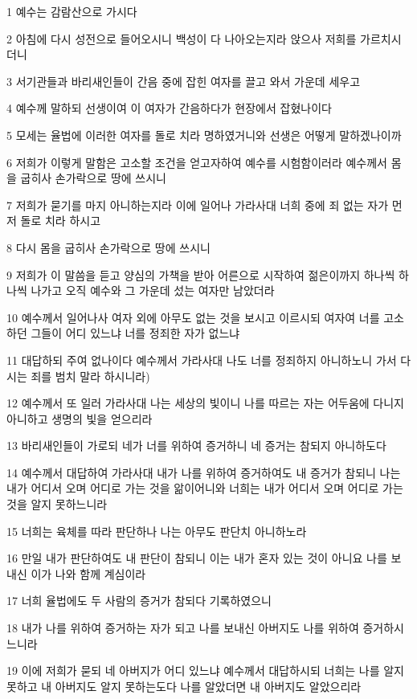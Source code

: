\par 1 예수는 감람산으로 가시다
\par 2 아침에 다시 성전으로 들어오시니 백성이 다 나아오는지라 앉으사 저희를 가르치시더니
\par 3 서기관들과 바리새인들이 간음 중에 잡힌 여자를 끌고 와서 가운데 세우고
\par 4 예수께 말하되 선생이여 이 여자가 간음하다가 현장에서 잡혔나이다
\par 5 모세는 율법에 이러한 여자를 돌로 치라 명하였거니와 선생은 어떻게 말하겠나이까
\par 6 저희가 이렇게 말함은 고소할 조건을 얻고자하여 예수를 시험함이러라 예수께서 몸을 굽히사 손가락으로 땅에 쓰시니
\par 7 저희가 묻기를 마지 아니하는지라 이에 일어나 가라사대 너희 중에 죄 없는 자가 먼저 돌로 치라 하시고
\par 8 다시 몸을 굽히사 손가락으로 땅에 쓰시니
\par 9 저희가 이 말씀을 듣고 양심의 가책을 받아 어른으로 시작하여 젊은이까지 하나씩 하나씩 나가고 오직 예수와 그 가운데 섰는 여자만 남았더라
\par 10 예수께서 일어나사 여자 외에 아무도 없는 것을 보시고 이르시되 여자여 너를 고소하던 그들이 어디 있느냐 너를 정죄한 자가 없느냐
\par 11 대답하되 주여 없나이다 예수께서 가라사대 나도 너를 정죄하지 아니하노니 가서 다시는 죄를 범치 말라 하시니라)
\par 12 예수께서 또 일러 가라사대 나는 세상의 빛이니 나를 따르는 자는 어두움에 다니지 아니하고 생명의 빛을 얻으리라
\par 13 바리새인들이 가로되 네가 너를 위하여 증거하니 네 증거는 참되지 아니하도다
\par 14 예수께서 대답하여 가라사대 내가 나를 위하여 증거하여도 내 증거가 참되니 나는 내가 어디서 오며 어디로 가는 것을 앎이어니와 너희는 내가 어디서 오며 어디로 가는 것을 알지 못하느니라
\par 15 너희는 육체를 따라 판단하나 나는 아무도 판단치 아니하노라
\par 16 만일 내가 판단하여도 내 판단이 참되니 이는 내가 혼자 있는 것이 아니요 나를 보내신 이가 나와 함께 계심이라
\par 17 너희 율법에도 두 사람의 증거가 참되다 기록하였으니
\par 18 내가 나를 위하여 증거하는 자가 되고 나를 보내신 아버지도 나를 위하여 증거하시느니라
\par 19 이에 저희가 묻되 네 아버지가 어디 있느냐 예수께서 대답하시되 너희는 나를 알지 못하고 내 아버지도 알지 못하는도다 나를 알았더면 내 아버지도 알았으리라
